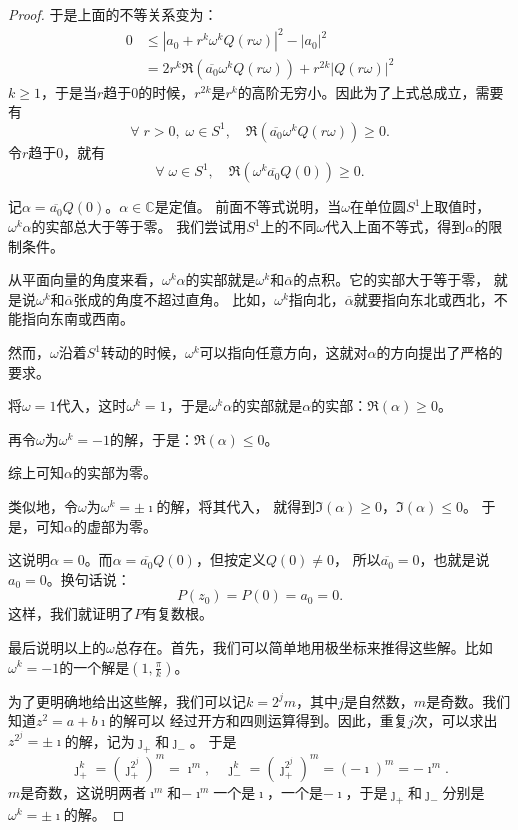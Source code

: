 \documentclass[12pt,UTF8]{ctexbook}
\begin{document}
\begin{appendix}
\begin{proof}
    于是上面的不等关系变为：
    \begin{align*}
        0 &\leqslant |a_0 + r^k \omega^k Q(r\omega)|^2 - |a_0|^2 \\
          &= 2r^k \Re(\overline{a_0} \omega^k Q(r\omega)) + r^{2k}|Q(r\omega)|^2 
    \end{align*}
    $k\geqslant 1$，于是当$r$趋于$0$的时候，$r^{2k}$是$r^k$的高阶无穷小。因此为了上式总成立，需要有
    $$ \forall \; r > 0,\; \omega \in S^1,\quad \Re(\overline{a_0} \omega^k Q(r\omega)) \geqslant 0. $$
    令$r$趋于$0$，就有
    $$ \forall \; \omega \in S^1,\quad \Re(\omega^k\overline{a_0} Q(0)) \geqslant 0. $$

    记$\alpha = \overline{a_0} Q(0)$。$\alpha \in\mathbb{C}$是定值。
    前面不等式说明，当$\omega$在单位圆$S^1$上取值时，$\omega^k \alpha$的实部总大于等于零。
    我们尝试用$S^1$上的不同$\omega$代入上面不等式，得到$\alpha$的限制条件。

    从平面向量的角度来看，$\omega^k \alpha$的实部就是$\omega^k$和$\overline{\alpha}$的点积。它的实部大于等于零，
    就是说$\omega^k$和$\overline{\alpha}$张成的角度不超过直角。
    比如，$\omega^k$指向北，$\overline{\alpha}$就要指向东北或西北，不能指向东南或西南。

    然而，$\omega$沿着$S^1$转动的时候，$\omega^k$可以指向任意方向，这就对$\alpha$的方向提出了严格的要求。

    将$\omega = 1$代入，这时$\omega^k = 1$，于是$\omega^k \alpha$的实部就是$\alpha$的实部：$\Re(\alpha) \geqslant 0$。

    再令$\omega$为$\omega^k = -1$的解，于是：$\Re(\alpha) \leqslant 0$。%

    综上可知$\alpha$的实部为零。

    类似地，令$\omega$为$\omega^k = \pm \imath$的解，将其代入，%
    就得到$\Im(\alpha) \geqslant 0$，$\Im(\alpha) \leqslant 0$。
    于是，可知$\alpha$的虚部为零。

    这说明$\alpha = 0$。而$\alpha = \overline{a_0} Q(0)$，但按定义$Q(0)\neq 0$，
    所以$\overline{a_0} = 0$，也就是说$a_0 = 0$。换句话说：
    $$ P(z_0) = P(0) = a_0 = 0. $$
    这样，我们就证明了$P$有复数根。

    最后说明以上的$\omega$总存在。首先，我们可以简单地用极坐标来推得这些解。比如$\omega^k = -1$的一个解是$\left(1, \frac{\pi}{k}\right)$。
    
    为了更明确地给出这些解，我们可以记$k = 2^j m$，其中$j$是自然数，$m$是奇数。我们知道$z^2 = a + b\imath$的解可以
    经过开方和四则运算得到。因此，重复$j$次，可以求出$z^{2^j} = \pm \imath$的解，记为$\jmath_+$和$\jmath_-$。
    于是
    $$\jmath_+^k = \left(\jmath_+^{2^j}\right)^m = \imath^m, \quad \jmath_-^k = \left(\jmath_+^{2^j}\right)^m = (-\imath)^m = -\imath^m.$$
    $m$是奇数，这说明两者$\imath^m$和$-\imath^m$一个是$\imath$，一个是$-\imath$，于是$\jmath_+$和$\jmath_-$分别是$\omega^k = \pm \imath$的解。


\end{proof}
\end{appendix}
\end{document}
